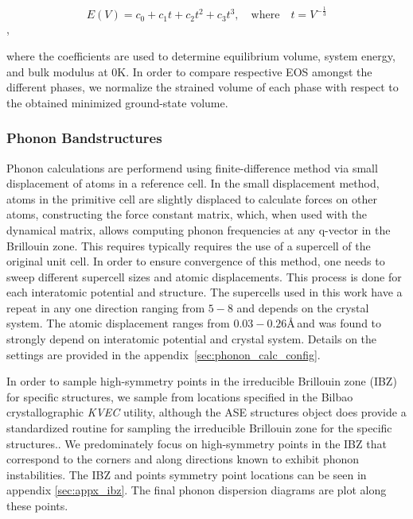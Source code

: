 \documentclass[preprint]{elsarticle}
\begin{document}
\begin{equation}
  \label{eq:eos_fit}
  E(V) = c_0 + c_1 t + c_2 t^2 + c_3 t^3, \quad \text{where} \quad t = V^{-\frac{1}{3}}
\end{equation},

where the coefficients are used to determine equilibrium volume, system energy, and bulk modulus \cite{Alchagirov2003} at 0K. In order to compare respective EOS amongst the different phases, we normalize the strained volume of each phase with respect to the obtained minimized ground-state volume. \par

\subsubsection{Phonon Bandstructures}
Phonon calculations are performend using finite-difference method via small displacement of atoms in a reference cell.\cite{Alfe2009} In the small displacement method, atoms in the primitive cell are slightly displaced to calculate forces on other atoms, constructing the force constant matrix, which, when used with the dynamical matrix, allows computing phonon frequencies at any q-vector in the Brillouin zone. This requires typically requires the use of a supercell of the original unit cell. In order to ensure convergence of this method, one needs to sweep different supercell sizes and atomic displacements. This process is done for each interatomic potential and structure. The supercells used in this work  have a repeat in any one direction ranging from $5-8$ and depends on the crystal system. The atomic displacement ranges from $0.03-0.26$\AA\,and was found to strongly depend on interatomic potential and crystal system. Details on the settings are provided in the appendix~\ref{sec:phonon_calc_config}. \par

In order to sample high-symmetry points in the irreducible Brillouin zone (IBZ) for specific structures, we sample from locations specified in the Bilbao crystallographic \textit{KVEC} utility\cite{Aroyo2014}, although the ASE structures object does provide a standardized routine for sampling the irreducible Brillouin zone for the specific structures.\cite{Setyawan2010}. We predominately focus on high-symmetry points in the IBZ that correspond to the corners and along directions known to exhibit phonon instabilities. The IBZ and points symmetry point locations can be seen in appendix \ref{sec:appx_ibz}. The final phonon dispersion diagrams are plot along these points. \par
\end{document}
